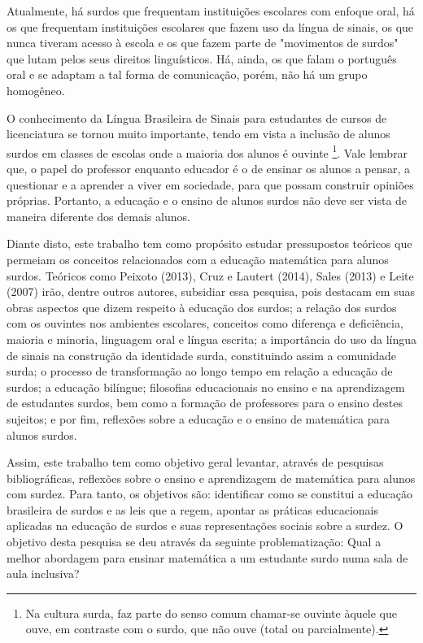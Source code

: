 \documentclass[brasil]{abnt}
\begin{document}
	Atualmente, há surdos que frequentam instituições escolares com enfoque oral, há os que frequentam instituições escolares que fazem uso da língua de sinais, os que nunca tiveram acesso à escola e os 
	que fazem parte de "movimentos de surdos" que lutam pelos seus direitos linguísticos. Há, ainda, os que falam o português oral e se adaptam a tal forma de comunicação, porém, não há um grupo homogêneo. 	
	
	O conhecimento da Língua Brasileira de Sinais para estudantes de cursos de licenciatura se tornou muito importante, tendo em vista a inclusão de alunos surdos em classes de escolas onde a maioria dos alunos é ouvinte
	\footnote{Na cultura surda, faz parte do senso comum chamar-se ouvinte àquele que ouve, em contraste com o surdo, que não ouve (total ou parcialmente).}. 
	Vale lembrar que, o papel do professor enquanto educador é o de ensinar os alunos a pensar, a questionar e a aprender a viver em sociedade, para que possam construir opiniões próprias. Portanto, a educação e o ensino de
	alunos surdos não deve ser vista de maneira diferente dos demais alunos.
	
	Diante disto, este trabalho tem como propósito estudar pressupostos 
	teóricos que permeiam os conceitos relacionados com a educação 
	matemática para alunos surdos. Teóricos como Peixoto (2013), Cruz 
	e Lautert (2014), Sales (2013) e Leite (2007) irão, dentre outros autores, subsidiar essa pesquisa, pois destacam em suas obras aspectos que dizem respeito à educação dos surdos; a relação dos surdos com os ouvintes nos ambientes 
	escolares, conceitos como diferença e deficiência, maioria e minoria, linguagem oral e língua escrita; a importância do uso da língua de sinais na construção da identidade surda, constituindo assim a comunidade
	surda; o processo de transformação ao longo tempo em relação a educação de surdos; a educação bilíngue; filosofias educacionais no ensino e na aprendizagem de estudantes surdos, bem como a formação de professores para 
	o ensino destes sujeitos; e por fim, reflexões sobre a educação e o ensino de matemática para alunos surdos. 
	
	Assim, este trabalho tem como objetivo geral levantar, através de pesquisas bibliográficas, reflexões sobre o ensino e aprendizagem de matemática para alunos com surdez. 
	Para tanto, os objetivos são: identificar como se constitui a educação brasileira de surdos e as leis que a regem,  apontar as práticas educacionais aplicadas na educação de surdos e suas representações sociais sobre a 
	surdez. O objetivo desta pesquisa se deu através da seguinte problematização: Qual a melhor abordagem para ensinar matemática a um estudante surdo numa sala de aula inclusiva?  
	
\end{document}
